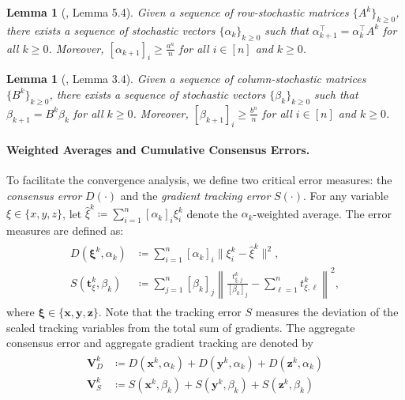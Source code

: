 \documentclass{article}
\theoremstyle{plain}
\newtheorem{lemma}[theorem]{Lemma}
\theoremstyle{definition}
\theoremstyle{remark}
\begin{document}
\begin{lemma}[\citealp{Nedic2025nash}, Lemma 5.4]\label{lem:alpha_vec}
    Given a sequence of row-stochastic matrices $\{A^{k}\}_{k \ge 0}$, there exists a sequence of stochastic vectors $\{\alpha_{k}\}_{k \ge 0}$ such that $\alpha_{k+1}^{\top} = \alpha_{k}^{\top}A^{k}$ for all $k \ge 0$. Moreover, $[\alpha_{k+1}]_{i} \ge \frac{a^{n}}{n}$ for all $i \in [n]$ and $k \ge 0$.
\end{lemma}

\begin{lemma}[\citealp{Nedic2025tvd}, Lemma 3.4]\label{lem:beta_vec}
    Given a sequence of column-stochastic matrices $\{B^{k}\}_{k \ge 0}$, there exists a sequence of stochastic vectors $\{\beta_{k}\}_{k \ge 0}$ such that $\beta_{k+1} = B^{k}\beta_{k}$ for all $k \ge 0$. Moreover, $[\beta_{k+1}]_{i} \ge \frac{b^{n}}{n}$ for all $i \in [n]$ and $k \ge 0$.
\end{lemma}

\paragraph{Weighted Averages and Cumulative Consensus Errors.}  
To facilitate the convergence analysis, we define two critical error measures: the \textit{consensus error} $D(\cdot)$ and the \textit{gradient tracking error} $S(\cdot)$. For any variable $\xi \in \{x, y, z\}$, let $\hat{\xi}^{k} \coloneqq \sum_{i=1}^{n}[\alpha_{k}]_{i}\xi_{i}^{k}$ denote the $\alpha_k$-weighted average. The error measures are defined as:
\begin{align}\label{def_error}
\begin{aligned}
    D(\boldsymbol{\xi}^{k},\alpha_{k}) &\coloneqq \sum_{i=1}^{n}[\alpha_{k}]_{i}\|\xi_{i}^{k}-\hat{\xi}^{k}\|^{2}, \\
    S(\mathbf{t}_{\xi}^{k},\beta_{k}) &\coloneqq \sum_{j=1}^{n}[\beta_{k}]_{j}\left\|\frac{t_{\xi,j}^{k}}{[\beta_{k}]_{j}}-\sum_{\ell=1}^{n}t_{\xi,\ell}^{k}\right\|^{2},
\end{aligned}
\end{align}
where $\boldsymbol{\xi} \in \{\mathbf{x}, \mathbf{y}, \mathbf{z}\}$. Note that the tracking error $S$ measures the deviation of the scaled tracking variables from the total sum of gradients.
The aggregate consensus error and  aggregate gradient tracking are denoted by 
\begin{align} \label{def_error_sum}
\begin{aligned}
    \mathbf{V}_{D}^{k} &\coloneqq D(\mathbf{x}^{k},\alpha_{k}) + D(\mathbf{y}^{k},\alpha_{k}) + D(\mathbf{z}^{k},\alpha_{k})\\
     \mathbf{V}_{S}^{k}& \coloneqq S(\mathbf{x}^{k},\beta_{k}) + S(\mathbf{y}^{k},\beta_{k}) + S(\mathbf{z}^{k},\beta_{k})
     \end{aligned}
\end{align}
\end{document}
